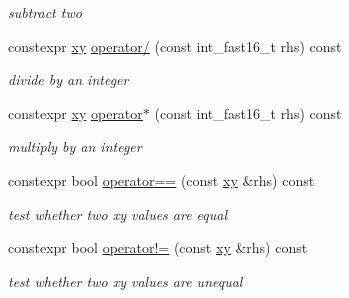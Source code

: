 \begin{DoxyCompactItemize}
\begin{DoxyCompactList}\small\item\em subtract two \end{DoxyCompactList}\item 
\mbox{\label{classhwlib_1_1xy_aedcbff14cac98d6f7fe5d96bd26f2d6f}} 
constexpr \hyperlink{classhwlib_1_1xy}{xy} \hyperlink{classhwlib_1_1xy_aedcbff14cac98d6f7fe5d96bd26f2d6f}{operator/} (const int\+\_\+fast16\+\_\+t rhs) const
\begin{DoxyCompactList}\small\item\em divide by an integer \end{DoxyCompactList}\item 
\mbox{\label{classhwlib_1_1xy_a1eebb8b83691a1b786b3bd84a07a6f4f}} 
constexpr \hyperlink{classhwlib_1_1xy}{xy} \hyperlink{classhwlib_1_1xy_a1eebb8b83691a1b786b3bd84a07a6f4f}{operator$\ast$} (const int\+\_\+fast16\+\_\+t rhs) const
\begin{DoxyCompactList}\small\item\em multiply by an integer \end{DoxyCompactList}\item 
\mbox{\label{classhwlib_1_1xy_a8625fc3260b87370898409b58a0ae52b}} 
constexpr bool \hyperlink{classhwlib_1_1xy_a8625fc3260b87370898409b58a0ae52b}{operator==} (const \hyperlink{classhwlib_1_1xy}{xy} \&rhs) const
\begin{DoxyCompactList}\small\item\em test whether two xy values are equal \end{DoxyCompactList}\item 
\mbox{\label{classhwlib_1_1xy_a510acfe28fe41bba5cfa837270aa6124}} 
constexpr bool \hyperlink{classhwlib_1_1xy_a510acfe28fe41bba5cfa837270aa6124}{operator!=} (const \hyperlink{classhwlib_1_1xy}{xy} \&rhs) const
\begin{DoxyCompactList}\small\item\em test whether two xy values are unequal \end{DoxyCompactList}\end{DoxyCompactItemize}
